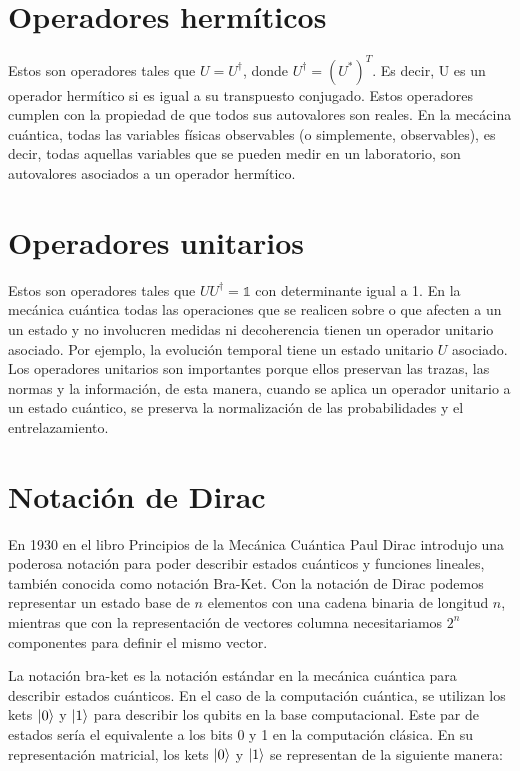 \section{Operadores hermíticos}

Estos son operadores tales que $U = U^\dagger$, donde $U^\dagger = (U^*)^T$. Es decir, U es un operador hermítico si es igual a su transpuesto conjugado. Estos operadores cumplen con la propiedad de que todos sus autovalores son reales. En la mecácina cuántica, todas las variables físicas observables (o simplemente, observables), es decir, todas aquellas variables que se pueden medir en un laboratorio, son autovalores asociados a un operador hermítico.

\section{Operadores unitarios}

Estos son operadores tales que $U U^\dagger = \mathds{1}$ con determinante igual a 1. En la mecánica cuántica todas las operaciones que se realicen sobre o que afecten a un un estado y no involucren medidas ni decoherencia tienen un operador unitario asociado. Por ejemplo, la evolución temporal tiene un estado unitario $U$ asociado. Los operadores unitarios son importantes porque ellos preservan las trazas, las normas y la información, de esta manera, cuando se aplica un operador unitario a un estado cuántico, se preserva la normalización de las probabilidades y el entrelazamiento.

\section{Notación de Dirac}

En 1930 en el libro Principios de la Mecánica Cuántica Paul Dirac introdujo una poderosa notación para poder describir estados cuánticos y funciones lineales, también conocida como notación Bra-Ket. Con la notación de Dirac podemos representar un estado base de $n$ elementos con una cadena binaria de longitud $n$, mientras que con la representación de vectores columna necesitariamos $2^n$ componentes para definir el mismo vector.

La notación bra-ket es la notación estándar en la mecánica cuántica para describir estados cuánticos. En el caso de la computación cuántica, se utilizan los kets $\ket{0}$ y $\ket{1}$ para describir los qubits en la base computacional. Este par de estados sería el equivalente a los bits 0 y 1 en la computación clásica. En su representación matricial, los kets $\ket{0}$ y $\ket{1}$ se representan de la siguiente manera:

